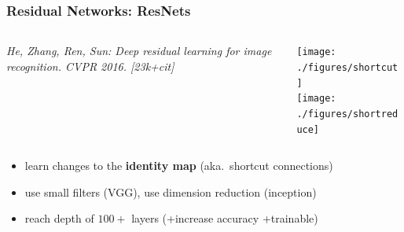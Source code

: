 \documentclass[compress]{beamer}
\newcommand{\textbblue}[1]{{\bf\color{Blue} #1}}
\newcommand{\is}[1]{\setlength{\itemsep}{#1}}
\begin{document}
\begin{frame} \frametitle{Residual Networks: ResNets}
\begin{columns}
\begin{column}{0.58\textwidth}
{\small \textit{He, Zhang, Ren, Sun: Deep residual learning for image recognition. CVPR 2016. [23k+cit]}}
\end{column}
\begin{column}{0.40\textwidth}
\begin{center}
\texttt{[image: ./figures/shortcut]}\\[3mm]
\texttt{[image: ./figures/shortreduce]}
\end{center}
\end{column}
\end{columns}
\vspace*{3mm}

\begin{itemize} \is{2mm}
\item learn changes to the \textbblue{identity map} (aka.~shortcut connections) 
\item use small filters (VGG), use dimension reduction (inception)
\item reach depth of $100+$ layers (+increase accuracy +trainable)
\end{itemize}
\end{frame}
\end{document}
